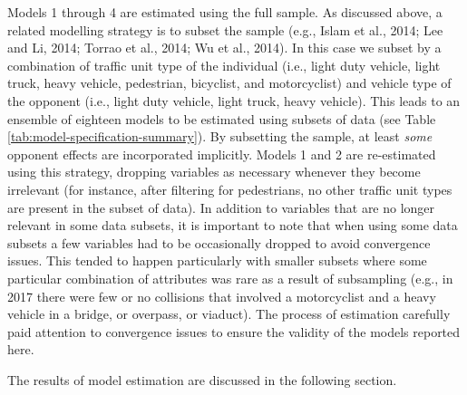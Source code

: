 \documentclass[]{elsarticle} %
\begin{document}
Models 1 through 4 are estimated using the full sample. As discussed
above, a related modelling strategy is to subset the sample (e.g., Islam
et al., 2014; Lee and Li, 2014; Torrao et al., 2014; Wu et al., 2014).
In this case we subset by a combination of traffic unit type of the
individual (i.e., light duty vehicle, light truck, heavy vehicle,
pedestrian, bicyclist, and motorcyclist) and vehicle type of the
opponent (i.e., light duty vehicle, light truck, heavy vehicle). This
leads to an ensemble of eighteen models to be estimated using subsets of
data (see Table \ref{tab:model-specification-summary}). By subsetting
the sample, at least \emph{some} opponent effects are incorporated
implicitly. Models 1 and 2 are re-estimated using this strategy,
dropping variables as necessary whenever they become irrelevant (for
instance, after filtering for pedestrians, no other traffic unit types
are present in the subset of data). In addition to variables that are no
longer relevant in some data subsets, it is important to note that when
using some data subsets a few variables had to be occasionally dropped
to avoid convergence issues. This tended to happen particularly with
smaller subsets where some particular combination of attributes was rare
as a result of subsampling (e.g., in 2017 there were few or no
collisions that involved a motorcyclist and a heavy vehicle in a bridge,
or overpass, or viaduct). The process of estimation carefully paid
attention to convergence issues to ensure the validity of the models
reported here.

The results of model estimation are discussed in the following section.
\end{document}

